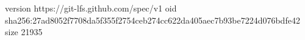 version https://git-lfs.github.com/spec/v1
oid sha256:27ad8052f7708da5f355f2754ceb274cc622da405aec7b93be7224d076bdfe42
size 21935
